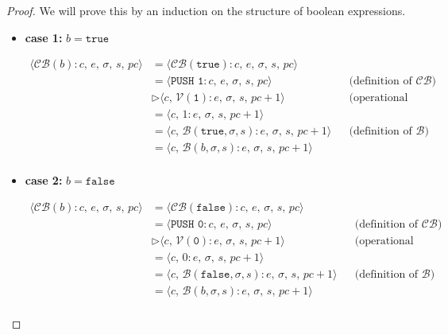 \documentclass{article}
\begin{document}
\begin{proof}
We will prove this by an induction on the structure of boolean expressions.

\begin{itemize}
    \item \textbf{case 1: } $b = \texttt{true}$

    \[
      \begin{aligned}
        \langle  \mathcal{CB}(b) : c,\, e,\, \sigma,\, s,\, pc \rangle 
        &= \langle \mathcal{CB}(\texttt{true}) : c,\, e,\, \sigma,\, s,\, pc \rangle \\
        &= \langle \texttt{PUSH 1}   : c,\, e,\, \sigma,\, s,\, pc \rangle 
        && \text{(definition of } \mathcal{CB}\text{)} \\
        &\triangleright \langle c,\, \mathcal{V}(\texttt{1}) : e,\, \sigma,\, s,\, pc+1 \rangle 
        && \text{(operational semantics)} \\
        &= \langle c,\, 1 : e,\, \sigma,\, s,\, pc+1 \rangle  
        \\
        &= \langle c,\, \mathcal{B}(\texttt{true}, \sigma, s) : e,\, \sigma,\, s,\, pc+1 \rangle 
        && \text{(definition of } \mathcal{B}\text{)} \\
        &= \langle c,\, \mathcal{B}(b, \sigma, s) : e,\, \sigma,\, s,\, pc+1 \rangle \\
      \end{aligned}
  \]

    \item \textbf{case 2: } $b = \texttt{false}$

    \[
      \begin{aligned}
        \langle  \mathcal{CB}(b) : c,\, e,\, \sigma,\, s,\, pc \rangle 
        &= \langle \mathcal{CB}(\texttt{false}) : c,\, e,\, \sigma,\, s,\, pc \rangle \\
        &= \langle \texttt{PUSH 0}   : c,\, e,\, \sigma,\, s,\, pc \rangle 
        && \text{(definition of } \mathcal{CB}\text{)} \\
        &\triangleright \langle c,\, \mathcal{V}(\texttt{0}) : e,\, \sigma,\, s,\, pc+1 \rangle 
        && \text{(operational semantics)} \\
        &= \langle c,\, 0 : e,\, \sigma,\, s,\, pc+1 \rangle 
        \\
        &= \langle c,\, \mathcal{B}(\texttt{false}, \sigma, s) : e,\, \sigma,\, s,\, pc+1 \rangle 
        && \text{(definition of } \mathcal{B}\text{)} \\
        &= \langle c,\, \mathcal{B}(b, \sigma, s) : e,\, \sigma,\, s,\, pc+1 \rangle \\
      \end{aligned}
  \]
  

\end{itemize}
\end{proof}
\end{document}
